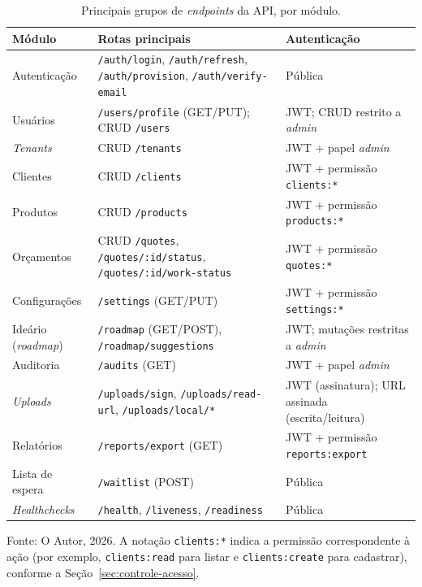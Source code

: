 \begin{table}[H]
  \centering
  \caption{Principais grupos de \textit{endpoints} da API, por módulo.}
  \label{tab:endpoints-api}
  \small
  \begin{tabular}{p{2.5cm}p{6.6cm}p{4.6cm}}
    \hline
    \textbf{Módulo} & \textbf{Rotas principais} & \textbf{Autenticação} \\
    \hline
    Autenticação & \texttt{/\allowbreak{}auth/\allowbreak{}login}, \texttt{/\allowbreak{}auth/\allowbreak{}refresh}, \texttt{/\allowbreak{}auth/\allowbreak{}provision}, \texttt{/\allowbreak{}auth/\allowbreak{}verify-email} & Pública \\
    Usuários & \texttt{/\allowbreak{}users/\allowbreak{}profile} (GET/PUT); CRUD \texttt{/\allowbreak{}users} & JWT; CRUD restrito a \textit{admin} \\
    \textit{Tenants} & CRUD \texttt{/\allowbreak{}tenants} & JWT + papel \textit{admin} \\
    Clientes & CRUD \texttt{/\allowbreak{}clients} & JWT + permissão \texttt{clients:*} \\
    Produtos & CRUD \texttt{/\allowbreak{}products} & JWT + permissão \texttt{products:*} \\
    Orçamentos & CRUD \texttt{/\allowbreak{}quotes}, \texttt{/\allowbreak{}quotes/\allowbreak{}:id/\allowbreak{}status}, \texttt{/\allowbreak{}quotes/\allowbreak{}:id/\allowbreak{}work-status} & JWT + permissão \texttt{quotes:*} \\
    Configurações & \texttt{/\allowbreak{}settings} (GET/PUT) & JWT + permissão \texttt{settings:*} \\
    Ideário (\textit{roadmap}) & \texttt{/\allowbreak{}roadmap} (GET/POST), \texttt{/\allowbreak{}roadmap/\allowbreak{}suggestions} & JWT; mutações restritas a \textit{admin} \\
    Auditoria & \texttt{/\allowbreak{}audits} (GET) & JWT + papel \textit{admin} \\
    \textit{Uploads} & \texttt{/\allowbreak{}uploads/\allowbreak{}sign}, \texttt{/\allowbreak{}uploads/\allowbreak{}read-url}, \texttt{/\allowbreak{}uploads/\allowbreak{}local/\allowbreak{}*} & JWT (assinatura); URL assinada (escrita/leitura) \\
    Relatórios & \texttt{/\allowbreak{}reports/\allowbreak{}export} (GET) & JWT + permissão \texttt{reports:export} \\
    Lista de espera & \texttt{/\allowbreak{}waitlist} (POST) & Pública \\
    \textit{Healthchecks} & \texttt{/\allowbreak{}health}, \texttt{/\allowbreak{}liveness}, \texttt{/\allowbreak{}readiness} & Pública \\
    \hline
  \end{tabular}
  \begin{minipage}{0.95\textwidth}
    \vspace{0.3em}
    {\small Fonte: O Autor, 2026. A notação \texttt{clients:*} indica a permissão correspondente à ação (por exemplo, \texttt{clients:read} para listar e \texttt{clients:create} para cadastrar), conforme a Seção~\ref{sec:controle-acesso}.}
  \end{minipage}
\end{table}

